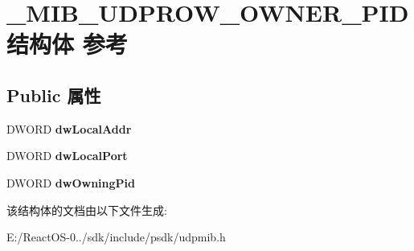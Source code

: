 \hypertarget{struct___m_i_b___u_d_p_r_o_w___o_w_n_e_r___p_i_d}{}\section{\+\_\+\+M\+I\+B\+\_\+\+U\+D\+P\+R\+O\+W\+\_\+\+O\+W\+N\+E\+R\+\_\+\+P\+I\+D结构体 参考}
\label{struct___m_i_b___u_d_p_r_o_w___o_w_n_e_r___p_i_d}
\subsection*{Public 属性}
\begin{DoxyCompactItemize}
\item 
\mbox{\label{struct___m_i_b___u_d_p_r_o_w___o_w_n_e_r___p_i_d_a7addcd1935c7037dd5f09b2ae660a810}} 
D\+W\+O\+RD {\bfseries dw\+Local\+Addr}
\item 
\mbox{\label{struct___m_i_b___u_d_p_r_o_w___o_w_n_e_r___p_i_d_ac56cd6d4c007dbed8d13ff61d46ccea2}} 
D\+W\+O\+RD {\bfseries dw\+Local\+Port}
\item 
\mbox{\label{struct___m_i_b___u_d_p_r_o_w___o_w_n_e_r___p_i_d_a5ceb89ca290fd68cb55505a1c7fd312f}} 
D\+W\+O\+RD {\bfseries dw\+Owning\+Pid}
\end{DoxyCompactItemize}


该结构体的文档由以下文件生成\+:\begin{DoxyCompactItemize}
\item 
E\+:/\+React\+O\+S-\/0../sdk/include/psdk/udpmib.\+h\end{DoxyCompactItemize}

